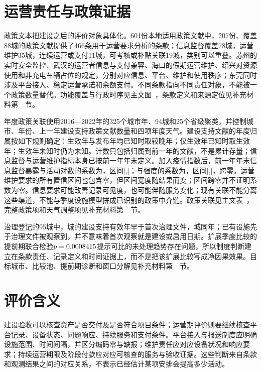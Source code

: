 \section*{运营责任与政策证据}
政策文本把建设之后的评价对象具体化。601份本地适用政策文献中，207份、覆盖88城的政策文献提供了466条用于运营要求分析的条款；信息监督覆盖78城，运营维护35城，连续运营或支付11城，可考核或补贴关联19城，类别可以重叠。苏州的实时安全监控、武汉的运营者信息与支付兼容、海口的假期运营维护、绍兴对资源使用和非充电车辆占位的规定，分别对应信息、平台、维护和使用秩序；东莞同时涉及平台接入、稳定运营承诺和余额支付。不同条款指向不同责任对象，不能被一个政策数量替代。功能覆盖与行政时序见主文图~，条款定义和来源定位见补充材料第~~节。

年度政策关联使用2016—2022年的325个城市年、94城和25个省级聚类，并控制城市、年份、上一年建设支持政策文献数量和四项年度天气。建设支持文献的年度归属按如下规则确定：生效年与发布年均已知时取较晚年；仅生效年已知时取生效年；生效年未知时仍为未知。计数只包括归属到前一年的文献，不是累计存量；信息监督与运营维护指标本身已按前一年年末定义。加入疫情指数后，前一年年末信息监督暴露与活动对数的系数为\PolicyRActivity{}，区间[\PolicyRActivityLow{},\PolicyRActivityHigh{}]；与强度的系数为\PolicyRIntensity{}，区间[\PolicyRIntensityLow{},\PolicyRIntensityHigh{}]，跨零。运营维护要求的所有置信区间也包含零，但区间宽度随结果而变；区间跨零并不证明系数为零。信息要求可能改善记录可见度，也可能伴随服务变化；现有关联不能分离这些渠道，不能与季度设施模型拼成已识别的政策中介链。政策关联见主文表~，完整政策项和天气调整项见补充材料第~~节。



治理登记的95城中，\BFirstCount{}城的建设支持有效年早于首次治理文件，\SameYearCount{}城同年；已有设施先于治理文件被观察到，并不意味着首次观察就是建设或启用日期。扩展季度比较的提前期联合检验$p=0.0008415$提示可比的未处理趋势存在问题，所以制度判断建立在条款责任、记录定义和时间证据上，而不是把该扩展比较写成净因果效果。目标城市、比较池、提前期诊断和窗口分解见补充材料第~~节。

\section*{评价含义}
建设验收可以核查资产是否交付及是否符合项目条件；运营期评价则要继续核查平台记录、设备状态、问题响应、持续服务和支付条件。平台接入与报送制度应明确设施范围、时间间隔，并区分编码零与缺报；维护责任应对应设备状况和响应要求；持续运营期限及阶段付款应对应可核查的服务与验收证据。这些判断来自条款和观测结果之间的对应关系，不表示已经估计某项安排会提高多少活动。

